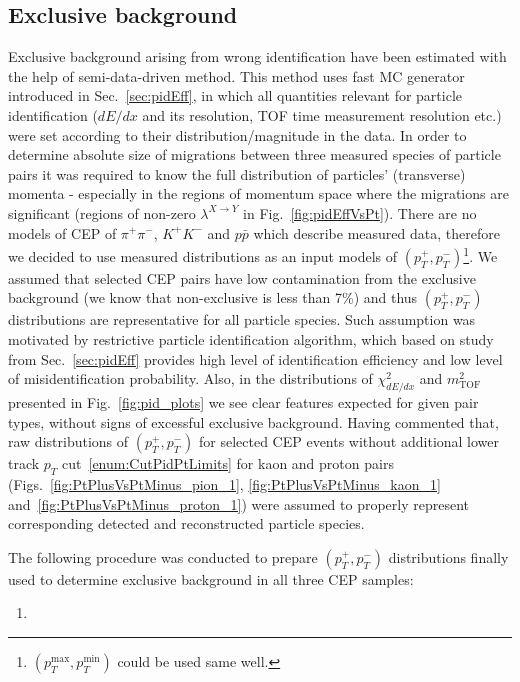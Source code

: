 \subsection{Exclusive background}\label{sec:exclBkgdDetermination}

Exclusive background arising from wrong identification have been estimated with the help of semi-data-driven method. This method uses fast MC generator introduced in Sec.~\ref{sec:pidEff}, in which all quantities relevant for particle identification ($dE/dx$ and its resolution, TOF time measurement resolution etc.) were set according to their distribution/magnitude in the data. In order to determine absolute size of migrations between three measured species of particle pairs it was required to know the full distribution of particles' (transverse) momenta - especially in the regions of momentum space where the migrations are significant (regions of non-zero $\lambda^{X\rightarrow Y}$ in Fig.~\ref{fig:pidEffVsPt}). There are no models of CEP of $\pi^{+}\pi^{-}$, $K^{+}K^{-}$ and $p\bar{p}$ which describe measured data, therefore we decided to use measured distributions as an input models of $(p_{T}^{+}, p_{T}^{-})$\footnote{$(p_{T}^{\text{max}}, p_{T}^{\text{min}})$ could be used same well.}. We assumed that selected CEP pairs have low contamination from the exclusive background (we know that non-exclusive is less than 7\%) and thus $(p_{T}^{+}, p_{T}^{-})$ distributions are representative for all particle species. Such assumption was motivated by restrictive particle identification algorithm, which based on study from Sec.~\ref{sec:pidEff} provides high level of identification efficiency and low level of misidentification probability. Also, in the distributions of $\chi^{2}_{dE/dx}$ and $m^{2}_{\text{TOF}}$ presented in Fig.~\ref{fig:pid_plots} we see clear features expected for given pair types, without signs of excessful exclusive background. Having commented that, raw distributions of $(p_{T}^{+}, p_{T}^{-})$ for selected CEP events without additional lower track $p_{T}$ cut~\ref{enum:CutPidPtLimits} for kaon and proton pairs (Figs.~\ref{fig:PtPlusVsPtMinus_pion_1}, \ref{fig:PtPlusVsPtMinus_kaon_1} and~\ref{fig:PtPlusVsPtMinus_proton_1}) were assumed to properly represent corresponding detected and reconstructed particle species.

The following procedure was conducted to prepare $(p_{T}^{+}, p_{T}^{-})$ distributions finally used to determine exclusive background in all three CEP samples:

\begin{enumerate}
 \item 
\end{enumerate}





